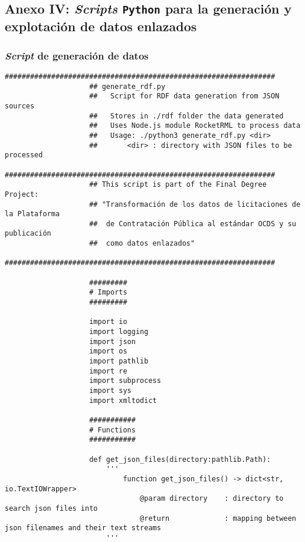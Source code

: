     \subsection{Anexo IV: \textit{Scripts} \texttt{Python} para la generación y explotación de datos enlazados} \label{annex:scriptspy}
        \subsubsection{\textit{Script} de generación de datos} \label{subsubsec:py1}
            \begin{minipage}{\linewidth}
                \begin{lstlisting}[language=lPython]
                    ################################################################
                    ## generate_rdf.py
                    ##   Script for RDF data generation from JSON sources
                    ##   Stores in ./rdf folder the data generated
                    ##   Uses Node.js module RocketRML to process data
                    ##   Usage: ./python3 generate_rdf.py <dir>
                    ##       <dir> : directory with JSON files to be processed
                    ################################################################
                    ## This script is part of the Final Degree Project:
                    ## "Transformación de los datos de licitaciones de la Plataforma
                    ##  de Contratación Pública al estándar OCDS y su publicación
                    ##  como datos enlazados"
                    ################################################################
                    
                    #########
                    # Imports
                    #########
                    
                    import io
                    import logging
                    import json
                    import os
                    import pathlib
                    import re
                    import subprocess
                    import sys
                    import xmltodict
                    
                    ###########
                    # Functions
                    ###########
                    
                    def get_json_files(directory:pathlib.Path):
                        '''
                            function get_json_files() -> dict<str, io.TextIOWrapper>
                                @param directory    : directory to search json files into
                                @return             : mapping between json filenames and their text streams
                        '''
                    

\end{lstlisting}
\end{minipage}
